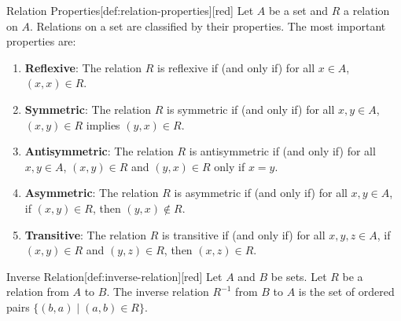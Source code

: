 \begin{define}{Relation Properties}[def:relation-properties][red]
  Let $A$ be a set and $R$ a relation on $A$. Relations on a set are classified by their properties. The most important properties are:
  \begin{enumerate}
    \item \textbf{Reflexive}: The relation $R$ is reflexive if (and only if) for all $x \in A$, $(x, x) \in R$.
    \item \textbf{Symmetric}: The relation $R$ is symmetric if (and only if) for all $x, y \in A$, $(x, y) \in R$ implies $(y, x) \in R$.
    \item \textbf{Antisymmetric}: The relation $R$ is antisymmetric if (and only if) for all $x, y \in A$, $(x, y) \in R$ and $(y, x) \in R$ only if $x=y$.
    \item \textbf{Asymmetric}: The relation $R$ is asymmetric if (and only if) for all $x, y \in A$, if $(x, y) \in R$, then $(y, x) \notin R$.
    \item \textbf{Transitive}: The relation $R$ is transitive if (and only if) for all $x, y, z \in A$, if $(x, y) \in R$ and $(y, z) \in R$, then $(x, z) \in R$.
  \end{enumerate}
\end{define}

\begin{define}{Inverse Relation}[def:inverse-relation][red]
  Let $A$ and $B$ be sets. Let $R$ be a relation from $A$ to $B$. The inverse relation $R^{-1}$ from $B$ to $A$ is the set of ordered pairs $\{(b, a) \mid(a, b) \in R\}$.
\end{define}











